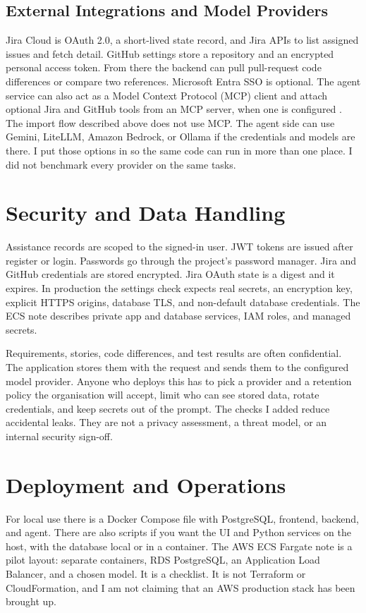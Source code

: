 \subsection{External Integrations and Model Providers}
Jira Cloud is OAuth 2.0, a short-lived state record, and Jira APIs to list assigned issues and fetch detail. GitHub settings store a repository and an encrypted personal access token. From there the backend can pull pull-request code differences or compare two references. Microsoft Entra SSO is optional. The agent service can also act as a Model Context Protocol (MCP) client and attach optional Jira and GitHub tools from an MCP server, when one is configured \cite{mcpdocs}. The import flow described above does not use MCP. The agent side can use Gemini, LiteLLM, Amazon Bedrock, or Ollama if the credentials and models are there. I put those options in so the same code can run in more than one place. I did not benchmark every provider on the same tasks.

\section{Security and Data Handling}
Assistance records are scoped to the signed-in user. JWT tokens are issued after register or login. Passwords go through the project's password manager. Jira and GitHub credentials are stored encrypted. Jira OAuth state is a digest and it expires. In production the settings check expects real secrets, an encryption key, explicit HTTPS origins, database TLS, and non-default database credentials. The ECS note describes private app and database services, IAM roles, and managed secrets.

Requirements, stories, code differences, and test results are often confidential. The application stores them with the request and sends them to the configured model provider. Anyone who deploys this has to pick a provider and a retention policy the organisation will accept, limit who can see stored data, rotate credentials, and keep secrets out of the prompt. The checks I added reduce accidental leaks. They are not a privacy assessment, a threat model, or an internal security sign-off.

\section{Deployment and Operations}
For local use there is a Docker Compose file with PostgreSQL, frontend, backend, and agent. There are also scripts if you want the UI and Python services on the host, with the database local or in a container. The AWS ECS Fargate note is a pilot layout: separate containers, RDS PostgreSQL, an Application Load Balancer, and a chosen model. It is a checklist. It is not Terraform or CloudFormation, and I am not claiming that an AWS production stack has been brought up.

